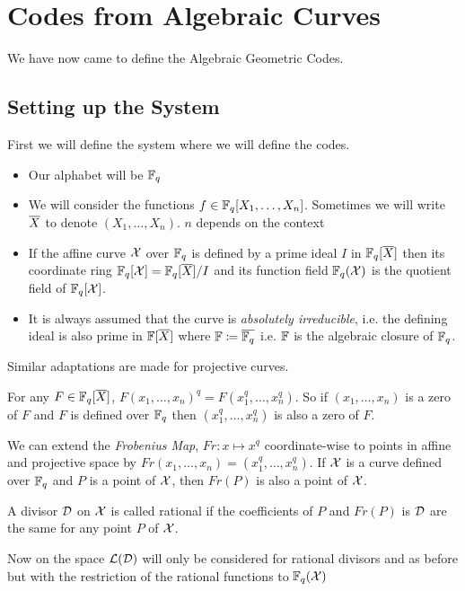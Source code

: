 \chapter{Codes from Algebraic Curves}
We have now came to define the Algebraic Geometric Codes.
\section{Setting up the System}
 First we will define the system where we will define the codes.
\begin{itemize}
	\item Our alphabet will be $\mathbb{F}_q$
	\item We will consider the functions $f\in \mathbb{F}_q[X_1,\dots, X_n]$. Sometimes we will write $\overline{X}$ to denote $(X_1,\dots, X_n)$. $n$ depends on the context
	\item If the affine curve $\mathcal{X}$ over $\mathbb{F}_q$ is defined by a prime ideal $I$ in $\mathbb{F}_q[\overline{X}]$ then its coordinate ring $\mathbb{F}_q[\mathcal{X}]=\mathbb{F}_q[\overline{X}]/I$ and its function field $\mathbb{F}_q(\mathcal{X})$ is the quotient field of $\mathbb{F}_q[\mathcal{X}]$.
	\item It is always assumed that the curve is \textit{absolutely irreducible}, i.e.  the defining ideal is also prime in $\mathbb{F}[\overline{X}]$ where $\mathbb{F}\coloneqq \overline{\mathbb{F}_q}$ i.e. $\mathbb{F}$ is the algebraic closure of $\mathbb{F}_q$.
\end{itemize}
Similar adaptations are made for projective curves. 

\begin{observation*}
	For any $F\in \mathbb{F}_q[\overline{X}]$, $F(x_1,\dots, x_n)^q=F(x_1^q,\dots, x_n^q)$. So if $(x_1,\dots, x_n)$ is a zero of $F$ and $F$ is defined over $\mathbb{F}_q$ then $(x_1^q,\dots, x_n^q)$ is also a zero of $F$.
\end{observation*}
We can extend the \textit{Frobenius Map}, $Fr:x\mapsto x^q$ coordinate-wise to points in affine and projective space by $Fr(x_1,\dots, x_n)=(x_1^q,\dots, x_n^q)$. If $\mathcal{X}$ is a curve defined over $\mathbb{F}_q$ and $P$ is a point of $\mathcal{X}$, then $Fr(P)$ is also a  point of $\mathcal{X}$.

\begin{definition}
	A divisor $\mathcal{D}$ on $\mathcal{X}$ is called rational if the coefficients of $P$ and $Fr(P)$ is $\mathcal{D}$ are the same for any point $P$ of $\mathcal{X}$.
\end{definition}
\begin{remark}
	Now on the space $\mathcal{L}(\mathcal{D})$ will only be considered for rational divisors and as before but with the restriction of the rational functions to $\mathbb{F}_q(\mathcal{X})$
\end{remark}

